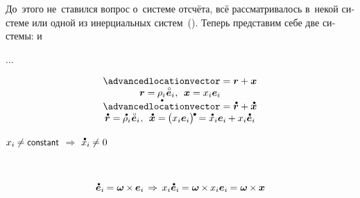 \begin{otherlanguage}{russian}

До~этого не~ставился вопрос о~системе отсчёта, всё рассматривалось в~некой  системе или одной из инерциальных систем~().
Теперь представим себе две системы:  и~

...

\begin{equation*}
\begin{array}{c}
\advancedlocationvector = \locationvector + \bm{x}
\\
\locationvector = \hspace{-0.1ex} \rho_i \hspace{.1ex} \mathcircabove{\bm{e}}_i
\hspace{.1ex} , \:\:
\bm{x} = x_i \bm{e}_i
\\
\mathdotabove{\advancedlocationvector} = \mathdotabove{\locationvector} + \mathdotabove{\bm{x}}
\\
\mathdotabove{\locationvector} = \hspace{-0.1ex}
\mathdotabove{\rho}_i \hspace{.1ex} \mathcircabove{\bm{e}}_i
\hspace{.1ex} , \:\:
\mathdotabove{\bm{x}} = \hspace{-0.15ex} \bigl( x_i \bm{e}_i \bigr)^{\hspace{-0.15ex}\tikz[baseline=-0.2ex]\draw[black, fill=black] (0,0) circle (.28ex);} \hspace{-0.15ex}
= \mathdotabove{x}_i \bm{e}_i \hspace{-0.1ex} + x_i \mathdotabove{\bm{e}}_i
\end{array}
\end{equation*}

${x_i \hspace{-0.1ex} \neq \constant}$ $\Rightarrow$ ${\mathdotabove{x}_i \hspace{-0.1ex} \neq 0}$

~

\nopagebreak\vspace{-0.2em}\begin{equation*}
\mathdotabove{\bm{e}}_i \hspace{-0.1ex} = \bm{\omega} \hspace{-0.1ex} \times \hspace{-0.1ex} \bm{e}_i
\hspace{.33ex} \Rightarrow \hspace{.4ex}
x_i \mathdotabove{\bm{e}}_i \hspace{-0.1ex} = \bm{\omega} \hspace{-0.1ex} \times \hspace{-0.1ex} x_i \bm{e}_i \hspace{-0.1ex}
= \bm{\omega} \hspace{-0.1ex} \times \hspace{-0.1ex} \bm{x}
\end{equation*}


\end{otherlanguage}

